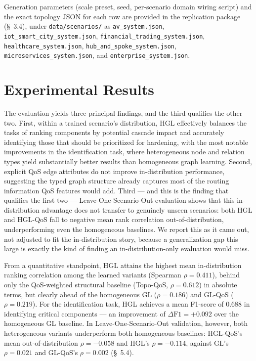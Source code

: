 \documentclass[review]{elsarticle}
\begin{document}
Generation parameters (scale preset, seed, per-scenario domain wiring script) and the exact
topology JSON for each row are provided in the replication package (\S~3.4), under
\texttt{data/scenarios/} as \texttt{av\_system.json}, \texttt{iot\_smart\_city\_system.json},
\texttt{financial\_trading\_system.json}, \texttt{healthcare\_system.json},
\texttt{hub\_and\_spoke\_system.json}, \texttt{microservices\_system.json}, and
\texttt{enterprise\_system.json}.

\section{Experimental Results}

The evaluation yields three principal findings, and the third qualifies the other two. First,
within a trained scenario's distribution, HGL effectively balances the tasks of ranking components
by potential cascade impact and accurately identifying those that should be prioritized for
hardening, with the most notable improvements in the identification task, where heterogeneous node
and relation types yield substantially better results than homogeneous graph learning. Second,
explicit QoS edge attributes do not improve in-distribution performance, suggesting the typed graph
structure already captures most of the routing information QoS features would add. Third --- and
this is the finding that qualifies the first two --- Leave-One-Scenario-Out evaluation shows that
this in-distribution advantage does not transfer to genuinely unseen scenarios: both HGL and
HGL-QoS fall to negative mean rank correlation out-of-distribution, underperforming even the
homogeneous baselines. We report this as it came out, not adjusted to fit the in-distribution
story, because a generalization gap this large is exactly the kind of finding an
in-distribution-only evaluation would miss.

From a quantitative standpoint, HGL attains the highest mean in-distribution ranking correlation
among the learned variants (Spearman $\rho=0.411$), behind only the QoS-weighted structural
baseline (Topo-QoS, $\rho=0.612$) in absolute terms, but clearly ahead of the homogeneous GL
($\rho=0.186$) and GL-QoS ($\rho=0.219$). For the identification task, HGL achieves a mean F1-score
of 0.688 in identifying critical components --- an improvement of $\Delta\text{F1}=+0.092$ over the
homogeneous GL baseline. In Leave-One-Scenario-Out validation, however, both heterogeneous variants
underperform both homogeneous baselines: HGL-QoS's mean out-of-distribution $\rho=-0.058$ and
HGL's $\rho=-0.114$, against GL's $\rho=0.021$ and GL-QoS's $\rho=0.002$ (\S~5.4).
\end{document}
